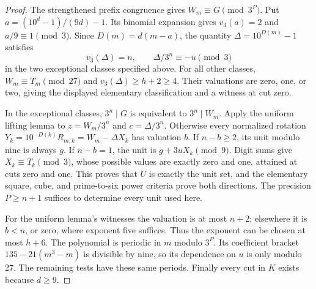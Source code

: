 \documentclass[10pt]{article}
\begin{document}
\begin{proof}
The strengthened prefix congruence gives $W_m\equiv G\pmod{3^P}$.
Put $a=(10^d-1)/(9d)-1$. Its binomial expansion gives
$v_3(a)=2$ and $a/9\equiv1\pmod3$.
Since $D(m)=d(m-a)$, the quantity $\Delta=10^{D(m)}-1$ satisfies
\[
 v_3(\Delta)=n,\qquad \Delta/3^n\equiv-u\pmod3
\]
in the two exceptional classes specified above.
For all other classes, $W_m\equiv T_m\pmod{27}$ and
$v_3(\Delta)\ge h+2\ge4$. Their valuations are zero, one, or two,
giving the displayed elementary classification and a witness at cut zero.

In the exceptional classes, $3^n\mid G$ is equivalent to
$3^n\mid W_m$. Apply the uniform lifting lemma to
$z=W_m/3^n$ and $c=\Delta/3^n$.
Otherwise every normalized rotation
$Y_k=10^{-D(k)}R_{m,k}=W_m-\Delta X_k$ has valuation $b$.
If $n-b\ge2$, its unit modulo nine is always $g$.
If $n-b=1$, the unit is $g+3uX_k\pmod9$.
Digit sums give $X_k\equiv T_k\pmod3$, whose possible values are
exactly zero and one, attained at cuts zero and one. This proves
that $U$ is exactly the unit set, and the elementary square, cube,
and prime-to-six power criteria prove both directions.
The precision $P\ge n+1$ suffices to determine every unit used here.

For the uniform lemma's witnesses the valuation is at most $n+2$;
elsewhere it is $b<n$, or zero, where exponent five suffices.
Thus the exponent can be chosen at most $h+6$.
The polynomial is periodic in $m$ modulo $3^P$.
Its coefficient bracket $135-21(m^3-m)$ is divisible by nine,
so its dependence on $u$ is only modulo 27. The remaining tests have
these same periods. Finally every cut in $K$ exists because $d\ge9$.
\end{proof}
\end{document}
